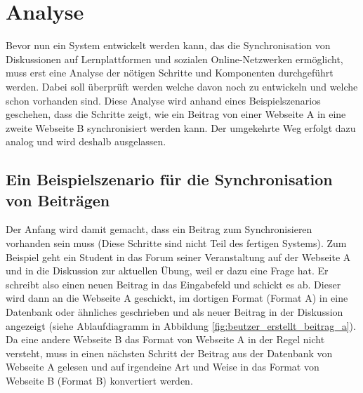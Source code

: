 
\chapter{Analyse} %
\label{cha:analyse}

Bevor nun ein System entwickelt werden kann, das die Synchronisation von Diskussionen auf Lernplattformen und sozialen Online-Netzwerken ermöglicht, muss erst eine Analyse der nötigen Schritte und Komponenten durchgeführt werden. Dabei soll überprüft werden welche davon noch zu entwickeln und welche schon vorhanden sind. Diese Analyse wird anhand eines Beispielszenarios geschehen, dass die Schritte zeigt, wie ein Beitrag von einer Webseite A in eine zweite Webseite B synchronisiert werden kann. Der umgekehrte Weg erfolgt dazu analog und wird deshalb ausgelassen.

\section{Ein Beispielszenario für die Synchronisation von Beiträgen} %
\label{sec:analyse_beispiel}

Der Anfang wird damit gemacht, dass ein Beitrag zum Synchronisieren vorhanden sein muss (Diese Schritte sind nicht Teil des fertigen Systems). Zum Beispiel geht ein Student in das Forum seiner Veranstaltung auf der Webseite A und in die Diskussion zur aktuellen Übung, weil er dazu eine Frage hat. Er schreibt also einen neuen Beitrag in das Eingabefeld und schickt es ab. Dieser wird dann an die Webseite A geschickt, im dortigen Format (Format A) in eine Datenbank oder ähnliches geschrieben und als neuer Beitrag in der Diskussion angezeigt (siehe Ablaufdiagramm in Abbildung \ref{fig:beutzer_erstellt_beitrag_a}). Da eine andere Webseite B das Format von Webseite A in der Regel nicht versteht, muss in einen nächsten Schritt der Beitrag aus der Datenbank von Webseite A gelesen und auf irgendeine Art und Weise in das Format von Webseite B (Format B) konvertiert werden. 

